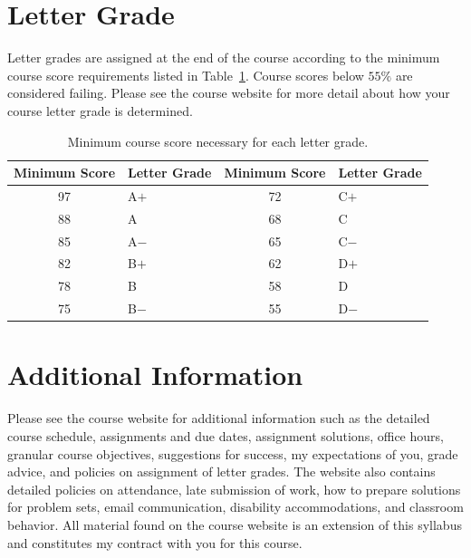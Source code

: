 \documentclass[letterpaper,oneside,onecolumn,11pt,article]{memoir}
\begin{document}
\section{Letter Grade}
Letter grades are assigned at the end of the course according to the minimum course score requirements listed in Table~\ref{tab:lettergrades}. Course scores below $55\%$ are considered failing. Please see the course website for more detail about how your course letter grade is determined. 
\begin{table}[h]
\caption{\sffamily Minimum course score necessary for each letter grade.}
\label{tab:lettergrades}
\begin{tabular}{cl||cl} \toprule
\textbf{Minimum Score} & \textbf{Letter Grade} & \textbf{Minimum Score} & \textbf{Letter Grade} \\ \hline
97 & \hspace{0.3in}A$+$ & 72 & \hspace{0.3in}C$+$ \\
88 & \hspace{0.3in}A & 68 & \hspace{0.3in}C \\
85 & \hspace{0.3in}A$-$ & 65 & \hspace{0.3in}C$-$ \\
82 & \hspace{0.3in}B$+$ & 62 & \hspace{0.3in}D$+$ \\
78 & \hspace{0.3in}B & 58 & \hspace{0.3in}D \\
75 & \hspace{0.3in}B$-$ & 55 & \hspace{0.3in}D$-$ \\
\bottomrule
\end{tabular}
\end{table}
%
%
\section{Additional Information}
Please see the course website for additional information such as the detailed course schedule, assignments and due dates, assignment solutions, office hours, granular course objectives, suggestions for success, my expectations of you, grade advice, and policies on assignment of letter grades. The website also contains detailed policies on attendance, late submission of work, how to prepare solutions for problem sets, email communication, disability accommodations, and classroom behavior. All material found on the course website is an extension of this syllabus and constitutes my contract with you for this course. 
%
%
\end{document}

